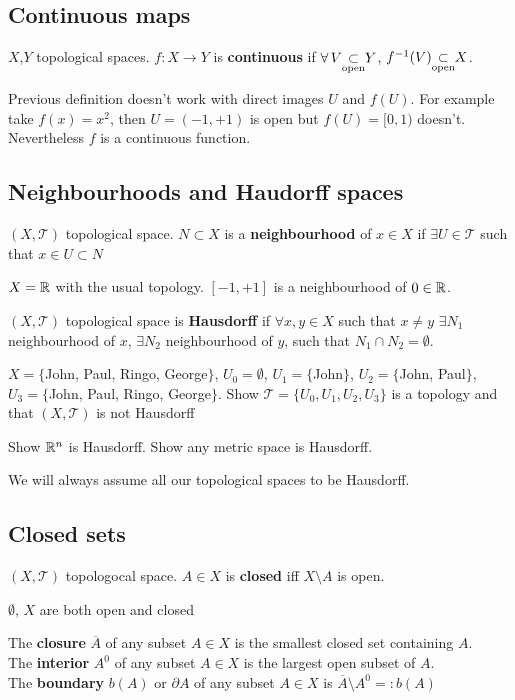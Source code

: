 \documentclass[../main/main.tex]{subfiles}
\newcommand{\opensubset}{\hspace{-1mm}\underset{\tiny\text{open}}{\subset}\hspace{-1mm}}
\newcommand{\topo}{\mathcal T}
\begin{document}
\subsection{Continuous maps}
\begin{dfn}
$X$,$Y$ topological spaces. $f:X\to Y$ is \textbf{continuous} if $\forall\, V\opensubset Y$, $f^{-1}(V)\opensubset X$.
\end{dfn}

\begin{oss}
Previous definition doesn't work with direct images $U$ and $f(U)$. For example take $f(x)=x^2$, then $U=(-1,+1)$ is open but $f(U)=[0,1)$ doesn't. Nevertheless $f$ is a continuous function.
\end{oss}

\subsection{Neighbourhoods and Haudorff spaces}
\begin{dfn}
$(X,\topo)$ topological space. $N\subset X$ is a \textbf{neighbourhood} of $x\in X$ if $\exists U\in\topo$ such that $x\in U\subset N$
\end{dfn}
\begin{es}
$X=\mathbb R$ with the usual topology. $[-1,+1]$ is a neighbourhood of $0\in\mathbb R$.
\end{es}
\begin{dfn}
$(X,\topo)$ topological space is \textbf{Hausdorff} if $\forall x,y\in X$ such that $x\neq y$ $\exists N_1$ neighbourhood of $x$, $\exists N_2$ neighbourhood of $y$, such that $N_1\cap N_2=\emptyset$.
\end{dfn}
\begin{ex}
$X=\{$John, Paul, Ringo, George$\}$, $U_0=\emptyset$, $U_1=\{$John$\}$, $U_2=\{$John, Paul$\}$, $U_3=\{$John, Paul, Ringo, George$\}$. Show $\topo=\{U_0,U_1,U_2,U_3\}$ is a topology and that $(X,\topo)$ is not Hausdorff
\end{ex}
\begin{ex}
Show $\mathbb R^n$ is Hausdorff. Show any metric space is Hausdorff.
\end{ex}
\textsf{We will always assume all our topological spaces to be Hausdorff.}


\subsection{Closed sets}
\begin{dfn}
$(X,\topo)$ topologocal space. $A\in X$ is \textbf{closed} iff $X\setminus A$ is open.
\end{dfn}
\begin{es}
$\emptyset$, $X$ are both open and closed
\end{es}
\begin{dfn}
The \textbf{closure} $\overline A$ of any subset $A\in X$ is the smallest closed set containing $A$.\\
The \textbf{interior} $A^0$ of any subset $A\in X$ is the largest open subset of $A$.\\
The \textbf{boundary} $b(A)$ or $\partial A$ of any subset $A\in X$ is $\overline A\setminus A^0=:b(A)$
\end{dfn}
\end{document}
